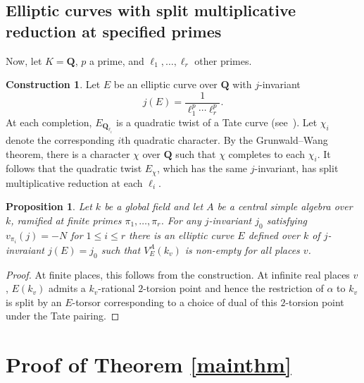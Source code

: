 \documentclass[10pt,letterpaper,twoside]{article}
\renewcommand{\1}{\mathbf{1}}
\newcommand{\bQ}{\mathbf{Q}}
\renewcommand{\leq}{\leqslant}
\theoremstyle{plain}
\newtheorem{proposition}[theorem]{Proposition}
\theoremstyle{plain}
\theoremstyle{definition}
\theoremstyle{named}
\theoremstyle{definition}
\newtheorem{construction}[theorem]{Construction}
\begin{document}
\subsection{Elliptic curves with split multiplicative reduction at specified primes}

Now, let $K=\bQ$, $p$ a prime, and $\ell_1,\ldots,\ell_r$ other primes.

\begin{construction}\label{const:multiplicative}
    Let $E$ be an elliptic curve over $\bQ$ with $j$-invariant
    $$j(E)=\frac{1}{\ell_1^p\cdots\ell_r^p}.$$
    At each completion, $E_{\bQ_{\ell_i}}$ is a quadratic twist of a Tate curve
    (see~\cite[Thm.~C.14.1]{silverman}). Let $\chi_i$ denote the corresponding $i$th quadratic character. By the
    Grunwald--Wang theorem, there is a character $\chi$ over $\bQ$ such that $\chi$ completes to
    each $\chi_i$. It follows that the quadratic twist $E_\chi$, which has the same $j$-invariant,
    has split multiplicative reduction at each $\ell_i$.
\end{construction}

\begin{proposition}
    Let $k$ be a global field and let $A$ be a central simple algebra over $k$, ramified at finite
    primes $\pi_1,\ldots,\pi_r$. For any $j$-invariant $j_0$ satisfying
    $v_{\pi_i}(j)=-N$ for $1\leq i\leq r$ there is an elliptic curve $E$ defined over $k$ of
    $j$-invraiant $j(E)=j_0$ such that $V_E^A(k_v)$ is non-empty for all places $v$.
\end{proposition}

\begin{proof}
    At finite places, this follows from the construction. At infinite real places $v$, $E(k_v)$ admits a
    $k_v$-rational $2$-torsion point and hence the restriction of $\alpha$ to $k_v$ is split by an
    $E$-torsor corresponding to a choice of dual of this $2$-torsion point under the Tate pairing.
\end{proof}



\section{Proof of Theorem \ref{mainthm}}
\end{document}
